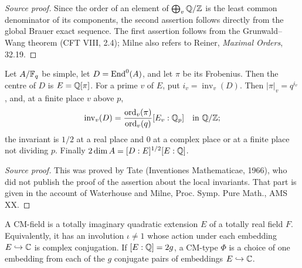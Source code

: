\begin{proof}[Source proof]

Since the order of an element of $\bigoplus_v\mathbb{Q}/\mathbb{Z}$ is the least common
denominator of its components, the second assertion follows directly from the
global Brauer exact sequence.  The first assertion follows from the
Grunwald--Wang theorem (CFT VIII, 2.4); Milne also refers to Reiner,
\emph{Maximal Orders}, 32.19.

\end{proof}

\begin{theorem}\label{thm:milne-simple-finite-field}
Let $A/\mathbb{F}_q$ be simple, let $D=\operatorname{End}^0(A)$, and let $\pi$ be its Frobenius.
Then the centre of $D$ is $E=\mathbb{Q}[\pi]$. For a prime $v$ of $E$, put
$i_v=\operatorname{inv}_v(D)$. Then $|\pi|_v=q^{i_v}$, and, at a finite
place $v$ above $p$,
\[
\operatorname{inv}_v(D)=
\frac{\operatorname{ord}_v(\pi)}{\operatorname{ord}_v(q)}[E_v:\mathbb{Q}_p]
\quad\text{in }\mathbb{Q}/\mathbb{Z};
\]
the invariant is $1/2$ at a real place and $0$ at a complex place or at a
finite place not dividing $p$.
Finally
$2\dim A=[D:E]^{1/2}[E:\mathbb{Q}]$.
\end{theorem}

\begin{proof}[Source proof]

This was proved by Tate (Inventiones Mathematicae, 1966), who did not publish
the proof of the assertion about the local invariants.  That part is given in
the account of Waterhouse and Milne, Proc. Symp. Pure Math., AMS XX.

\end{proof}

\begin{definition}\label{def:milne-cm-type}
A CM-field is a totally imaginary quadratic extension $E$ of a totally real
field $F$. Equivalently, it has an involution $\iota\ne 1$ whose action under
each embedding $E\hookrightarrow\mathbb{C}$ is complex conjugation. If $[E:\mathbb{Q}]=2g$,
a CM-type $\Phi$ is a choice of one embedding from each of the $g$ conjugate
pairs of embeddings $E\hookrightarrow\mathbb{C}$.
\end{definition}


